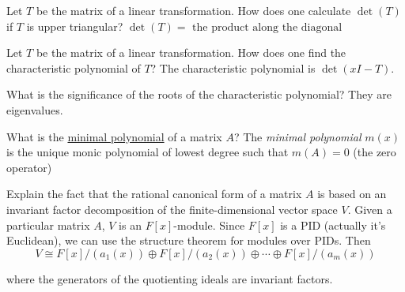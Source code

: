 \documentclass[avery5371,grid]{flashcards}
\begin{document}
\begin{flashcard}{Let $T$ be the matrix of a linear transformation. How does one calculate $\det(T)$ if $T$ is upper triangular?}
 $\det(T) = \text{ the product along the diagonal}$
\end{flashcard}

\begin{flashcard}{Let $T$ be the matrix of a linear transformation. How does one find the characteristic polynomial of $T$?}
 The characteristic polynomial is $\det(xI - T)$.
\end{flashcard}

\begin{flashcard}{What is the significance of the roots of the characteristic polynomial?}
 They are eigenvalues.
\end{flashcard}

\begin{flashcard}{What is the \underline{minimal polynomial} of a matrix $A$?}
 The \emph{minimal polynomial} $m(x)$ is the unique monic polynomial of lowest degree such that $m(A) = 0$ (the zero operator)
\end{flashcard}

\begin{flashcard}{Explain the fact that the rational canonical form of a matrix $A$ is based on an invariant factor decomposition of the finite-dimensional vector space $V$.}
 Given a particular matrix $A$, $V$ is an $F[x]$-module. Since $F[x]$ is a PID (actually it's Euclidean), we can use the structure theorem for modules over PIDs. Then 
 $$ V \cong F[x]/(a_1(x)) \oplus F[x]/(a_2(x)) \oplus \cdots \oplus F[x]/(a_m(x))$$
 
 where the generators of the quotienting ideals are invariant factors.
\end{flashcard}
\end{document}
